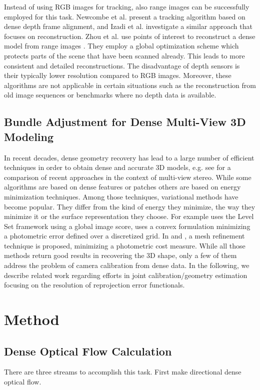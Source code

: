 \documentclass{article}
\begin{document}
Instead of using RGB images for tracking, also range images can be successfully employed for this task. Newcombe et al. \cite{Newcombe2011KinectFusion} present a tracking algorithm based on dense depth frame alignment, and Izadi et al. \cite{Izadi2011KinectFusion} investigate a similar approach that focuses on reconstruction. Zhou et al. use points of interest to reconstruct a dense model from range images \cite{Zhou2013Dense}. They employ a global optimization scheme which protects parts of the scene that have been scanned already. This leads to more consistent and detailed reconstructions. The disadvantage of depth sensors is their typically lower resolution compared to RGB images. Moreover, these algorithms are not applicable in certain situations such as the reconstruction from old image sequences or benchmarks where no depth data is available.\par


\subsection{Bundle Adjustment for Dense Multi-View 3D Modeling}

In recent decades, dense geometry recovery has lead to a large number of efficient techniques in order to obtain dense and accurate 3D models, e.g. see \cite{Seitz2006A} \cite{Strecha2008On} for a comparison of recent approaches in the context of multi-view stereo. While some algorithms are based on dense features or patches \cite{Furukawa2008Accurate} others are based on energy minimization techniques. Among those techniques, variational methods have become popular. They differ from the kind of energy they minimize, the way they minimize it or the surface representation they choose. For example \cite{Pons2007Multi} uses the Level Set framework using a global image score, \cite{Kolev2009Continuous} uses a convex formulation minimizing a photometric error defined over a discretized grid. In \cite{Delaunoy2011Gradient} and \cite{Vu2012High}, a mesh refinement technique is proposed, minimizing a photometric cost measure. While all those methods return good results in recovering the 3D shape, only a few of them address the problem of camera calibration from dense data. In the following, we describe related work regarding efforts in joint calibration/geometry estimation focusing on the resolution of reprojection error functionals.






\section{Method}
\subsection{Dense Optical Flow Calculation}
There are three streams to accomplish this task. First make directional dense optical flow.






\end{document}
